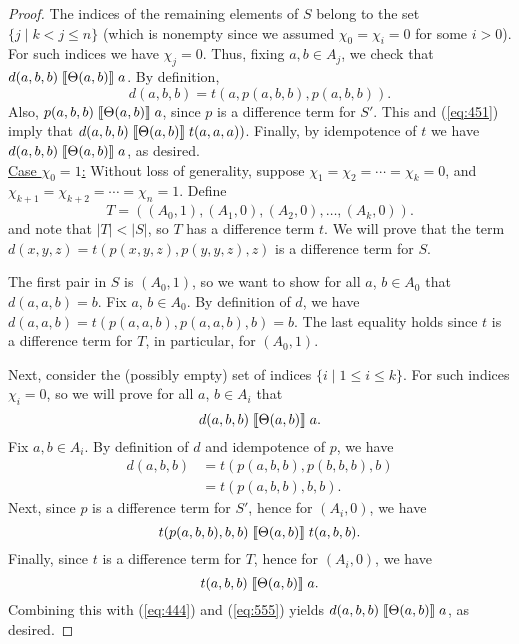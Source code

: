 \begin{proof}
The indices of the remaining elements of $S$
belong to the set $\{j \mid k<j\leq n\}$ (which is nonempty since we
assumed $\chi_0 = \chi_i = 0$ for some $i>0$).
For such indices we have $\chi_j = 0$.
Thus, fixing $a, b \in A_j$, we check that
$d(a,b,b)\mathrel{\llbracket \Theta(a,b) \rrbracket} a$.
By definition,
\begin{equation}
  \label{eq:451}
d(a,b,b) =t(a, p(a,b,b), p(a,b,b)).  
\end{equation}
Also, $p(a,b,b) \mathrel{\llbracket \Theta(a,b) \rrbracket} a$,
since $p$ is a \glocal difference term for $S'$.
This and (\ref{eq:451}) imply
that
$d(a, b,b) \mathrel{\llbracket \Theta(a,b) \rrbracket} t(a,a,a))$.
Finally, by idempotence of $t$ we have
$d(a,b,b)\mathrel{\llbracket \Theta(a,b) \rrbracket} a$,
as desired.
\\[6pt]
\underline{Case $\chi_0 = 1$:}
Without loss of generality, suppose $\chi_1 = \chi_2 =\cdots =\chi_k = 0$,
and $\chi_{k+1} = \chi_{k+2} = \cdots = \chi_{n} = 1$.
Define
\[
T = ((A_0, 1), (A_1, 0), (A_2, 0), \dots, (A_k, 0)).
\]
and note that $|T| < |S|$, so $T$ has a \glocal difference term $t$.
We will prove that the term $d(x,y,z) = t(p(x,y,z), p(y,y,z), z)$
is a \glocal difference term for $S$.

The first pair in $S$ is $(A_0, 1)$, so we want to show for all $a$, $b \in A_0$ that
$d(a,a,b) = b$.
Fix $a$, $b \in A_0$. By definition of $d$,
we have $d(a,a,b) = t(p(a,a,b), p(a,a,b), b) =b$.
The last equality holds since $t$ is a \glocal difference term for $T$, in particular,
for $(A_0, 1)$.

Next, consider the (possibly empty) set of indices $\{i \mid 1\leq i \leq k\}$.
For such indices $\chi_i =0$, so we will prove
for all $a$, $b \in A_i$ that
\[
d(a,b,b) \mathrel{\llbracket \Theta(a,b) \rrbracket} a.
\]
Fix $a, b\in A_i$.
By definition of $d$ and idempotence of $p$, we have
\begin{align}
  d(a,b,b) &=
  t(p(a,b,b), p(b,b,b), b)   \label{eq:444}\\
  &=t(p(a,b,b), b, b). \nonumber
\end{align}
Next, since $p$ is a \glocal difference term for $S'$,
hence for $(A_i, 0)$, we have
\begin{equation}
  \label{eq:555}
  t(p(a,b,b), b, b)
 \comr{\Cg(a,b)}
 t(a, b, b).
\end{equation}
Finally, since $t$ is a \glocal difference term for $T$, hence for
$(A_i, 0)$,  %
we have 
\[
t(a, b, b) \mathrel{\llbracket \Theta(a,b) \rrbracket} a.
\]
Combining this with (\ref{eq:444}) and (\ref{eq:555}) yields
$d(a,b,b) \mathrel{\llbracket \Theta(a,b) \rrbracket} a$,
as desired.


\end{proof}
